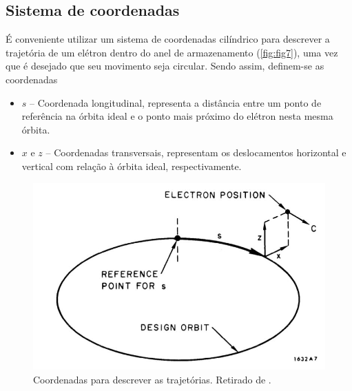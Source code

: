 \subsection{Sistema de coordenadas}
É conveniente utilizar um sistema de coordenadas cilíndrico para descrever a trajetória de um elétron dentro do anel de armazenamento (\autoref{fig:fig7}), uma vez que é desejado que seu movimento seja circular. Sendo assim, definem-se as coordenadas
\begin{itemize}
	\item $s$ -- Coordenada longitudinal, representa a distância entre um ponto de referência na órbita ideal e o ponto mais próximo do elétron nesta mesma órbita.
	\item $x$ e $z$ -- Coordenadas transversais, representam os deslocamentos horizontal e vertical com relação à órbita ideal, respectivamente.
\end{itemize}

\begin{figure}[!htb]
	\centering
	\includegraphics[width=0.6\linewidth]{./Figuras/fig7.jpeg}
	\caption{Coordenadas para descrever as trajetórias. Retirado de \cite{sands1970physics}.}
	\label{fig:fig7}
\end{figure}